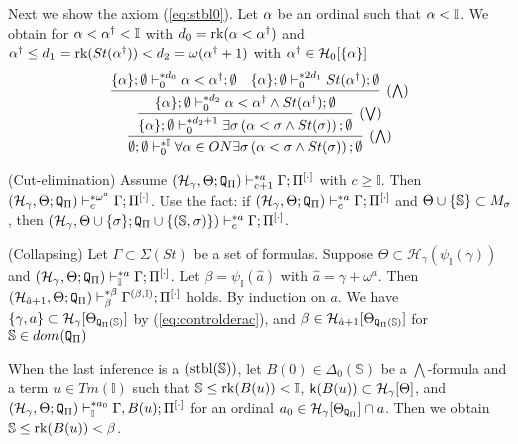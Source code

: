 \documentclass{article}
\newcommand{\mS}{\mathbb{S}}
\newcommand{\mI}{\mathbb{I}}
\begin{document}
Next we show the axiom (\ref{eq:stbl0}).
Let $\alpha$ be an ordinal such that $\alp<\mI$.
We obtain for $\alp<\alp^{\dagger}<\mI$ with $d_{0}=\mbox{{\rm rk}}(\alpha<\alpha^{\dagger})$
and $\alpha^{\dagger}\leq d_{1}=\mbox{{\rm rk}}(St(\alpha^{\dagger}))<d_{2}=\omega(\alpha^{\dagger}+1)$
with $\alpha^{\dagger}\in\mathcal{H}_{0}[\{\alpha\}]$
\[
\infer[(\bigwedge)]{
\emptyset;\emptyset \vdash^{* \mI}_{0}
\fal \alp\in ON \exi \sig \left(\alp<\sig \land St(\sig) \right);\emptyset
}
{
 \infer[(\bigvee)]{
\{\alp\};\emptyset \vdash^{* d_{2}+1}_{0} \exi \sig \left(\alp<\sig \land St(\sig)\right);\emptyset
 }
 {
  \infer[(\bigwedge)]{
 \{\alp\};\emptyset \vdash^{* d_{2}}_{0} 
  \alp<\alp^{\dagger} \land St(\alp^{\dagger});\emptyset
  }
  {
\{\alp\};\emptyset \vdash^{* d_{0}}_{0}\alp<\alp^{\dagger};\emptyset
  &
  \{\alp\};\emptyset \vdash^{* 2d_{1}}_{0} St(\alp^{\dagger});\emptyset
  }
 }
}
\]
\eprf




\blem\label{lem:predcepi1*}{\rm (Cut-elimination)}
Assume
$(\mathcal{H}_{\gamma},\Theta;{\tt Q}_{\Pi})\vdash^{* a}_{c+1}\Gamma;\Pi^{[\cdot]}$
with $c\geq\mI$.
Then $(\mathcal{H}_{\gamma},\Theta;{\tt Q}_{\Pi})\vdash^{* \omega^{a}}_{c}\Gamma;\Pi^{[\cdot]}$.
\elem
\bprf
Use the fact:
if $(\mathcal{H}_{\gamma},\Theta;{\tt Q}_{\Pi})\vdash^{* a}_{c}\Gamma;\Pi^{[\cdot]}$
and $\Tht\cup\{\mS\}\subset M_{\sig}$, then
$(\mathcal{H}_{\gamma},\Theta\cup\{\sig\};{\tt Q}_{\Pi}\cup\{(\mS,\sig)\})\vdash^{* a}_{c}\Gamma;\Pi^{[\cdot]}$.
\eprf



\blem\label{lem:Kcollpase.1}{\rm (Collapsing)}
Let
$\Gamma\subset\Sigma(St)$ be a set of formulas.
Suppose
$\Theta\subset
\mathcal{H}_{\gamma}(\psi_{\mI}(\gamma))$
 and
$
(\mathcal{H}_{\gamma},\Theta;{\tt Q}_{\Pi}
)\vdash^{* a}_{\mI}\Gamma;\Pi^{[\cdot]}
$.
Let
$\beta=\psi_{\mI}(\hat{a})$ with $\hat{a}=\gamma+\omega^{a}$.
Then 
$(\mathcal{H}_{\hat{a}+1},\Theta;{\tt Q}_{\Pi})
\vdash^{* \beta}_{\beta}
\Gamma^{(\beta,\mI)};\Pi^{[\cdot]}$ holds.
\elem
\bprf
By induction on $a$.
We have 
$\{\gamma, a\}\subset\mathcal{H}_{\gamma}[\Theta_{{\tt Q}_{\Pi}(\mS)}]$ by (\ref{eq:controlderac}),
and
$\beta\in\mathcal{H}_{\hat{a}+1}[\Theta_{{\tt Q}_{\Pi}(\mS)}]$ for $\mS\in dom({\tt Q}_{\Pi})$

When the last inference is a $({\rm stbl}(\mS))$, let
$B(0)\in\Delta_{0}(\mathbb{S})$ be a $\bigwedge$-formula
and a term $u\in Tm(\mI)$ such that
$\mS\leq{\rm rk}(B(u))<\mathbb{I}$,
${\sf k}(B(u))\subset \mathcal{H}_{\gamma}[\Theta]$,
and
$
(\mathcal{H}_{\gamma},\Theta;{\tt Q}_{\Pi}
)\vdash^{* a_{0}}_{\mI}
\Gamma, B(u);\Pi^{[\cdot]}
$ for an ordinal $a_{0}\in\mathcal{H}_{\gamma}[\Theta_{{\tt Q}_{\Pi}}]\cap a$.
Then we obtain
$\mS\leq{\rm rk}(B(u))<\beta$.
\eprf
\end{document}
